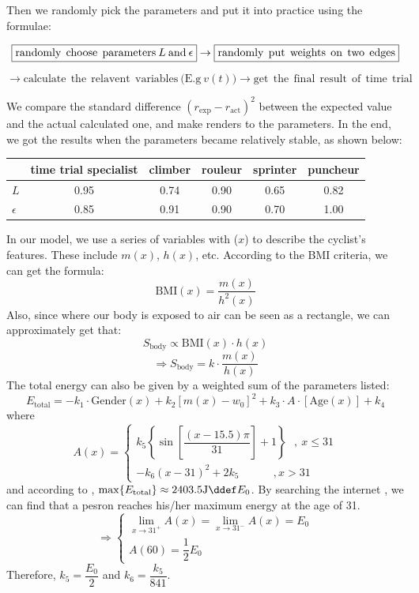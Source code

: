 \documentclass{article}
\begin{document}
			Then we randomly pick the parameters and put it into practice using the formulae:

			\[
				\boxed{\mathrm{randomly\:\:choose\:\:parameters\:}L\mathrm{\:and\:}\epsilon} \rightarrow
				\boxed{\mathrm{randomly\:\:put\:\:weights\:\:on\:\:two\:\:edges}} \\
			\]

			\[
				\rightarrow
				\boxed{\mathrm{calculate\:\:the\:\:relavent\:\:variables\:(E.g\:}v(t))} \rightarrow
				\boxed{{\mathrm{get\:\:the\:\:final\:\:result\:\:of\:\:time\:\:trial}}}
			\]

			We compare the standard difference \(\left( r_{\exp}-r_{\mathrm{act}} \right) ^2\) between the expected value and the actual calculated one, and make renders to the parameters. In the end, we got the results when the parameters became relatively stable, as shown below:

			\begin{center}
				\begin{tabular}{|l||c|c|c|c|c|}
					\hline
					&\textbf{time trial specialist} & \textbf{climber} & \textbf{rouleur} & \textbf{sprinter} & \textbf{puncheur} \\
					\hline
					\hline
					\(L\) & 0.95 & 0.74 & 0.90 & 0.65 & 0.82 \\
					\hline
					\(\epsilon\) & 0.85 & 0.91 & 0.90 & 0.70 & 1.00 \\
					\hline
				\end{tabular}
			\end{center}

			In our model, we use a series of variables with (\(x\)) to describe the cyclist's features. These include $m( x )$, $ h ( x )$, etc. According to the BMI criteria, we can get the formula:
			$$\mathrm{BMI}( x )=\dfrac{m( x )}{ h ^2( x )}$$
			Also, since where our body is exposed to air can be seen as a rectangle, we can approximately get that:
			\[S_{\mathrm{body}} \propto \mathrm{BMI}(x)\cdot h(x)\]
			\[\Rightarrow S_{\mathrm{body}}=k\cdot \dfrac{m(x)}{h(x)}\]
			The total energy can also be given by a weighted sum of the parameters listed:
			\[E_{\mathrm{total}}=-k_1\cdot\mathrm{Gender}(x)+k_2[m(x)-w_0]^2+k_3\cdot A\cdot [\mathrm{Age}(x)]+k_4\]
			where
			\[A(x)=
				\begin{cases}
					k_5\left\{\sin\left[\dfrac{(x-15.5)\pi}{31 }\right]+1\right\}~~~,~x\leq 31 \\
					-k_6 (x-31)^2+2k_5~~~~~~~~~~~~~~,x>31
				\end{cases}
			\]
			and according to \cite{114514}, \(\max\{E_{\mathrm{total}}\}\approx 2403.5 \mathrm{J}\ddef E_{0}\). By searching the internet \cite{energy curve}, we can find that a pesron reaches his/her maximum energy at the age of 31.
			\[
				\Rightarrow
				\begin{cases}
					\lim\limits_{x\rightarrow 31^+} A\left( x \right) =\lim\limits_{x\rightarrow 31^-} A\left( x \right)=E_0 \\
					A(60)=\dfrac 12 E_0
				\end{cases}
			\]
			Therefore, \(k_5 = \dfrac{E_0}{2}\) and \(k_6=\dfrac{k_5}{841}\).
\end{document}
